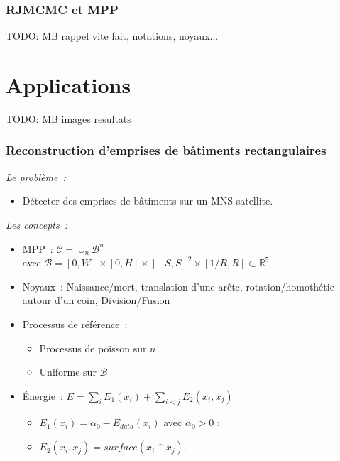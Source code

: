 \documentclass{beamer}
\begin{document}
\begin{frame}
\frametitle{RJMCMC et MPP}
TODO: MB
rappel vite fait, notations, noyaux...
\end{frame}



\section{Applications}

\begin{frame}
TODO: MB
images resultats
\end{frame}

\begin{frame}
\frametitle{Reconstruction d'emprises de bâtiments rectangulaires}
\emph{Le probl\`eme~:} 
\begin{itemize}
\item Détecter des emprises de bâtiments sur un MNS satellite.
\end{itemize}
\emph{Les concepts~:}
\begin{itemize}
\item MPP~:  $\mathcal{C} = \cup_{n}\mathcal{B}^n$\\
avec $\mathcal{B}=[0,W]\times[0,H]\times[-S,S]^2\times[1/R,R] \subset  \mathds{R}^{5}$
\item Noyaux~: Naissance/mort, translation d'une arête, rotation/homothétie autour d'un coin, Division/Fusion
\item Processus de référence~:
\begin{itemize}
\item Processus de poisson sur $n$
\item Uniforme sur $\mathcal{B}$
\end{itemize}
\item \'Energie~: $E = \sum_i E_1(x_i) + \sum_{i<j} E_2(x_i,x_j)$
\begin{itemize}
\item $E_1(x_i)=\alpha_{0} - E_{data}(x_i)$ avec $\alpha_{0}>0$ ;
\item $E_2(x_i,x_j) = surface(x_i \cap x_j)$.
\end{itemize}
\end{itemize}
\end{frame}
\end{document}
